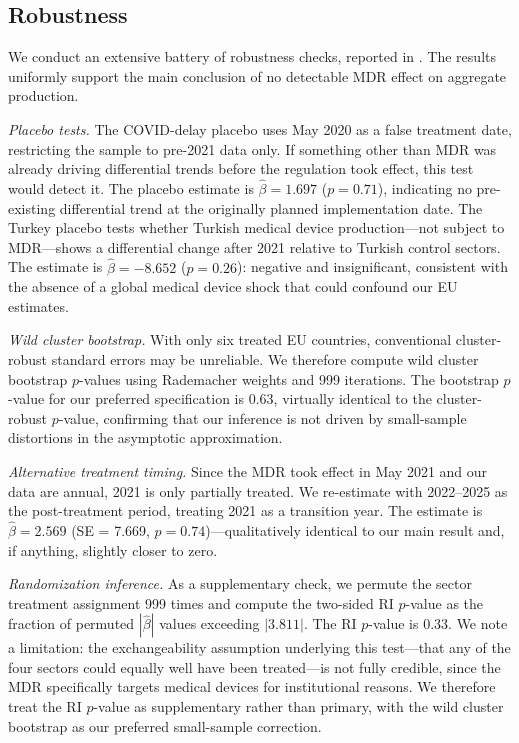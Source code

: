 \documentclass[12pt]{article}
\begin{document}
\subsection{Robustness}

We conduct an extensive battery of robustness checks, reported in . The results uniformly support the main conclusion of no detectable MDR effect on aggregate production.

\textit{Placebo tests.} The COVID-delay placebo uses May 2020 as a false treatment date, restricting the sample to pre-2021 data only. If something other than MDR was already driving differential trends before the regulation took effect, this test would detect it. The placebo estimate is $\hat{\beta} = 1.697$ ($p = 0.71$), indicating no pre-existing differential trend at the originally planned implementation date. The Turkey placebo tests whether Turkish medical device production---not subject to MDR---shows a differential change after 2021 relative to Turkish control sectors. The estimate is $\hat{\beta} = -8.652$ ($p = 0.26$): negative and insignificant, consistent with the absence of a global medical device shock that could confound our EU estimates.

\textit{Wild cluster bootstrap.} With only six treated EU countries, conventional cluster-robust standard errors may be unreliable. We therefore compute wild cluster bootstrap $p$-values using Rademacher weights and 999 iterations. The bootstrap $p$-value for our preferred specification is 0.63, virtually identical to the cluster-robust $p$-value, confirming that our inference is not driven by small-sample distortions in the asymptotic approximation.

\textit{Alternative treatment timing.} Since the MDR took effect in May 2021 and our data are annual, 2021 is only partially treated. We re-estimate with 2022--2025 as the post-treatment period, treating 2021 as a transition year. The estimate is $\hat{\beta} = 2.569$ (SE = 7.669, $p = 0.74$)---qualitatively identical to our main result and, if anything, slightly closer to zero.

\textit{Randomization inference.} As a supplementary check, we permute the sector treatment assignment 999 times and compute the two-sided RI $p$-value as the fraction of permuted $|\hat{\beta}|$ values exceeding $|3.811|$. The RI $p$-value is 0.33. We note a limitation: the exchangeability assumption underlying this test---that any of the four sectors could equally well have been treated---is not fully credible, since the MDR specifically targets medical devices for institutional reasons. We therefore treat the RI $p$-value as supplementary rather than primary, with the wild cluster bootstrap as our preferred small-sample correction.
\end{document}
